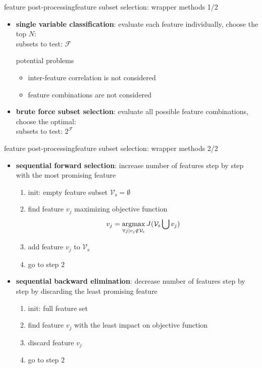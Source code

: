 		\begin{frame}{feature post-processing}{feature subset selection: wrapper methods 1/2}
			\begin{itemize}
				\item	\textbf{single variable classification}: evaluate each feature individually, choose the top $N$:\\
					subsets to test: $\mathcal{F}$
					
					\pause
					potential problems
					\begin{itemize}
						\item	inter-feature correlation is not considered
						\item	feature combinations are not considered
					\end{itemize}
				\pause
				\item	\textbf{brute force subset selection}: evaluate all possible feature combinations, choose the optimal:\\
					subsets to test: $2^\mathcal{F}$
			\end{itemize}
		\end{frame}
		\begin{frame}{feature post-processing}{feature subset selection: wrapper methods 2/2}
			\begin{itemize}
				\item	\textbf{sequential forward selection}: increase number of features step by step with the most promising feature
					
					\pause
					\begin{enumerate}
						\item	init: empty feature subset $\mathcal{V}_\mathrm{s} = {\emptyset}$
						\pause
						\item	find feature $v_j$ maximizing objective function
									\begin{equation}
										v_j = \operatorname*{argmax}_{\forall j | v_j \notin \mathcal{V}_\mathrm{s}} J({\mathcal{V}_\mathrm{s}} \bigcup v_j) 
									\end{equation}
						\pause						
						\item	add feature $v_j$ to $\mathcal{V}_\mathrm{s}$ 
						\pause						
						\item	go to step $2$
					\end{enumerate}
				\pause
				\item	\textbf{sequential backward elimination}: decrease number of features step by step by discarding the least promising feature
				
				\pause
					\begin{enumerate}
						\item	init: full feature set
						\pause
						\item	find feature $v_j$ with the least impact on objective function
						\pause
						\item	discard feature $v_j$
						\pause
						\item	go to step $2$
					\end{enumerate}
			\end{itemize}
		\end{frame}
